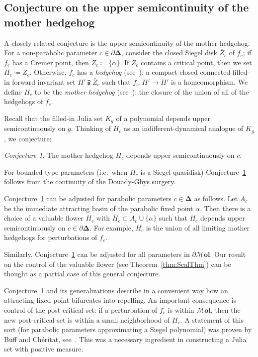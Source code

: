 \documentclass[]{amsart}
\newcommand\HH{\boldsymbol{\Delta}}%
\newcommand\Mol{{\boldsymbol{\mathcal{M}ol }}}
\theoremstyle{remark}
\newtheorem{conj}[thm]{Conjecture}
\numberwithin{equation}{section}
\theoremstyle{definition}
\begin{document}
\subsection{Conjecture on the upper semicontinuity of the mother hedgehog}
\label{ss:ap:conj:UppSemic}
A closely related conjecture is the upper semicontinuity of the mother hedgehog. For a non-parabolic parameter $c\in \partial \HH$, consider the closed Siegel disk $\overline Z_c$ of $f_c$; if $f_c$ has a Cremer point, then $\overline Z_c\coloneqq \{\alpha\}$. If $\overline Z_c$ contains a critical point, then we set $H_c\coloneqq \overline Z_c$. Otherwise, $f_c$ has a \emph{hedgehog} (see~\cite{PM}): a compact closed connected filled-in forward invariant set $H'\supsetneqq \overline Z_c$ such that $f_c\colon H'\to H'$ is a homeomorphism. We define $H_c$ to be the \emph{mother hedgehog} (see~\cite{Ch}): the closure of the union of all of the hedgehogs of $f_c$.


   

Recall that the filled-in Julia set $K_g$ of a polynomial depends upper semicontinuously on $g$. Thinking of $H_c$ as an indifferent-dynamical analogue of $K_g$, we conjecture:
\begin{conj}
\label{conj:ap:UppSemiCont}
The mother hedgehog $H_c$ depends upper semicontinuously on $c$. 
\end{conj}
For bounded type parameters (i.e.~when $H_c$ is a Siegel quasidisk) Conjecture~\ref{conj:ap:UppSemiCont} follows from the continuity of the Douady-Ghys surgery. 


 

Conjecture~\ref{conj:ap:UppSemiCont} can be adjusted for parabolic parameters $c\in \HH$ as follows. Let $A_c$ be the immediate attracting basin of the parabolic fixed point $\alpha$. Then there is a choice of a valuable flower $H_c$ with $\overline H_c\subset  A_c\cup \{\alpha\}$ such that $H_c$ depends upper semicontinuously on $c\in \partial \HH$. For example, $H_c$ is the union of all limiting mother hedgehogs for perturbations of $f_c$. 

Similarly, Conjecture~\ref{conj:ap:UppSemiCont} can be adjusted for  all parameters in $\partial \Mol$. Our result on the control of the valuable flower (see Theorem~\ref{thm:ScalThm}) can be thought as a partial case of this general conjecture.


Conjecture~\ref{conj:ap:UppSemiCont} and its generalizations describe in a convenient way how an attracting fixed point bifurcates into repelling. An important consequence is control of the post-critical set: if a perturbation of $f_c$ is within $\Mol$, then the new post-critical set is within a small neighborhood of $H_c$. A statement of this sort (for parabolic parameters approximating a Siegel polynomial) was proven by Buff and Ch\'eritat, see~\cite[Corollary 4]{BC}. This was a necessary ingredient in constructing a Julia set with positive measure.



\end{document}
